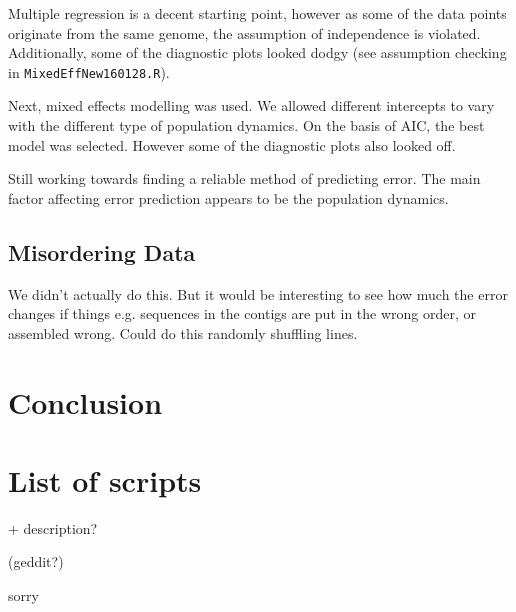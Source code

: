 \documentclass[11pt,a4paper]{article}
\begin{document}
Multiple regression is a decent starting point, however as some of the data points originate from the same genome, the assumption of independence is violated. Additionally, some of the diagnostic plots looked dodgy (see assumption checking in \verb|MixedEffNew160128.R|).

Next, mixed effects modelling was used. We allowed different intercepts to vary with the different type of population dynamics. On the basis of AIC, the best model was selected. However some of the diagnostic plots also looked off.

Still working towards finding a reliable method of predicting error. The main factor affecting error prediction appears to be the population dynamics.

\subsection{Misordering Data}
We didn't actually do this. But it would be interesting to see how much the error changes if things e.g. sequences in the contigs are put in the wrong order, or assembled wrong. Could do this randomly shuffling lines.



\section{Conclusion}

\appendix
\section{List of scripts}
+ description?

(geddit?)

sorry


{}
\end{document}
